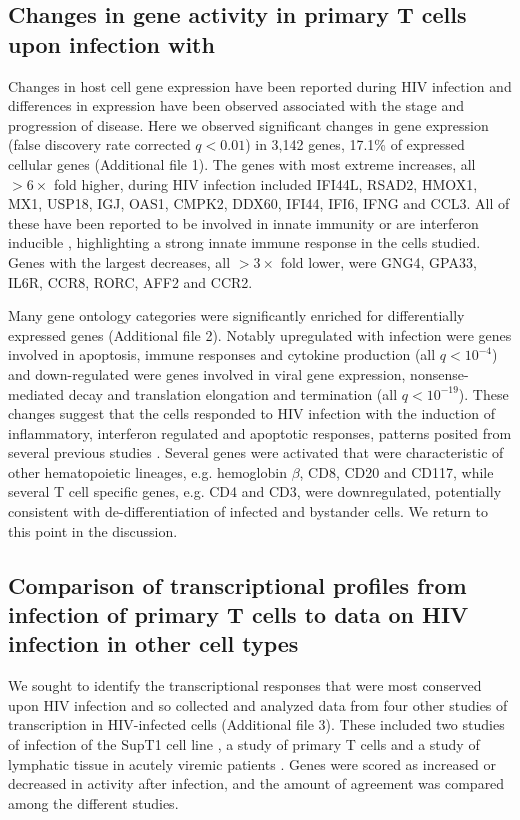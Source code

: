 \documentclass[../sherrill-Mix_thesis.tex]{subfiles}
\begin{document}
	\subsection{Changes in gene activity in primary T cells upon infection with \hivEight{}} %
		Changes in host cell gene expression have been reported during HIV infection \citep{Corbeil2001,Mitchell2003,Rotger2010,Lefebvre2011,Imbeault2012,Mohammadi2013} and differences in expression have been observed associated with the stage \citep{Li2009} and progression \citep{Rotger2011} of disease. Here we observed significant changes in gene expression (false discovery rate corrected $q<0.01$) in 3,142 genes, 17.1\% of expressed cellular genes (Additional file 1). The genes with most extreme increases, all $>6\times$ fold higher, during HIV infection included IFI44L, RSAD2, HMOX1, MX1, USP18, IGJ, OAS1, CMPK2, DDX60, IFI44, IFI6, IFNG and CCL3. All of these have been reported to be involved in innate immunity \citep{Breuer2013} or are interferon inducible \citep{Rusinova2013}, highlighting a strong innate immune response in the cells studied. Genes with the largest decreases, all $>3\times$ fold lower, were GNG4, GPA33, IL6R, CCR8, RORC, AFF2 and CCR2.

		Many gene ontology categories were significantly enriched for differentially expressed genes (Additional file 2). Notably upregulated with infection were genes involved in apoptosis, immune responses and cytokine production (all $q<10^{-4}$) and down-regulated were genes involved in viral gene expression, nonsense-mediated decay and translation elongation and termination (all $q<10^{-19}$). These changes suggest that the cells responded to HIV infection with the induction of inflammatory, interferon regulated and apoptotic responses, patterns posited from several previous studies \citep{Corbeil2001,delaFuente2002,Woelk2004,Hyrcza2007,Wu2008,Smith2010,Chang2011,Lefebvre2011,Imbeault2012,Mohammadi2013,Chang2013}. Several genes were activated that were characteristic of other hematopoietic lineages, e.g. hemoglobin $\beta$, CD8, CD20 and CD117, while several \cdFour{} T cell specific genes, e.g. CD4 and CD3, were downregulated, potentially consistent with de-differentiation of infected and bystander cells.  We return to this point in the discussion. 
	
	\subsection{Comparison of transcriptional profiles from \hivEight{} infection of primary T cells to data on HIV infection in other cell types}
		We sought to identify the transcriptional responses that were most conserved upon HIV infection and so collected and analyzed data from four other studies of transcription in HIV-infected cells (Additional file 3). These included two studies of infection of the SupT1 cell line \citep{Lefebvre2011,Chang2011}, a study of primary \cdFour{} T cells \citep{Imbeault2012} and a study of lymphatic tissue in acutely viremic patients \citep{Li2009}. Genes were scored as increased or decreased in activity after infection, and the amount of agreement was compared among the different studies.
\end{document}
